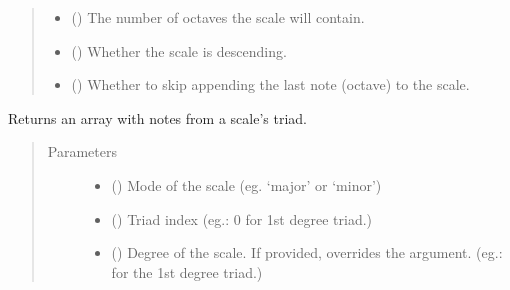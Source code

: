 \documentclass[letterpaper,10pt,english]{sphinxmanual}
\begin{document}
\begin{fulllineitems}
\begin{fulllineitems}
\begin{quote}
\begin{description}
\begin{itemize}
\item {} 
 () \textendash{} The number of octaves the scale will contain.

\item {} 
 () \textendash{} Whether the scale is descending.

\item {} 
 () \textendash{} Whether to skip appending the last
note (octave) to the scale.

\end{itemize}

\end{description}\end{quote}

\end{fulllineitems}


\begin{fulllineitems}
\label{\detokenize{birdears:birdears.scale.ChromaticScale.get_triad}}
Returns an array with notes from a scale’s triad.
\begin{quote}\begin{description}
\item[{Parameters}] \leavevmode\begin{itemize}
\item {} 
 () \textendash{} Mode of the scale (eg. ‘major’ or ‘minor’)

\item {} 
 () \textendash{} Triad index (eg.: 0 for 1st degree triad.)

\item {} 
 () \textendash{} Degree of the scale. If provided, overrides the
 argument. (eg.:  for the 1st degree triad.)


\end{itemize}
\end{description}
\end{quote}
\end{fulllineitems}
\end{fulllineitems}
\end{document}

